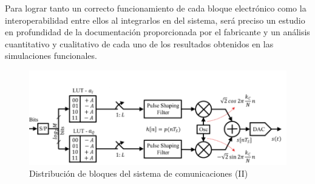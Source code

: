 \vspace{3mm}

Para lograr tanto un correcto funcionamiento de cada bloque electrónico como la interoperabilidad entre ellos al integrarlos en del sistema, será preciso un estudio en profundidad de la documentación proporcionada por el fabricante y un análisis cuantitativo y cualitativo de cada uno de los resultados obtenidos en las simulaciones funcionales. 

    \begin{figure}[h]
    	\centering
    	\includegraphics[width=1\textwidth]{img/diseno/sistema2.PNG}
    	\caption{Distribución de bloques del sistema de comunicaciones (II)}
    	\label{fig:sistema2}
    \end{figure}
    





